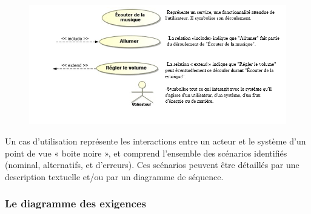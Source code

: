 \documentclass[12pt,a4paper]{report}
\begin{document}
\noindent \begin{flushleft}
	
	
	\begin{figure}[H]
		\centering
		\includegraphics[width=0.8\linewidth]{Capture.png}
	\end{figure}
	
	Un cas d'utilisation repr\'{e}sente les interactions entre un acteur et le syst\`{e}me d'un point de vue « boite noire », et comprend l'ensemble des sc\'{e}narios identifi\'{e}s (nominal, alternatifs, et d'erreurs). Ces sc\'{e}narios peuvent \^{e}tre d\'{e}taill\'{e}s par une description textuelle et/ou par un diagramme de s\'{e}quence.
	
	\noindent 
\end{flushleft}


\subsubsection{ Le diagramme des exigences}
\end{document}
